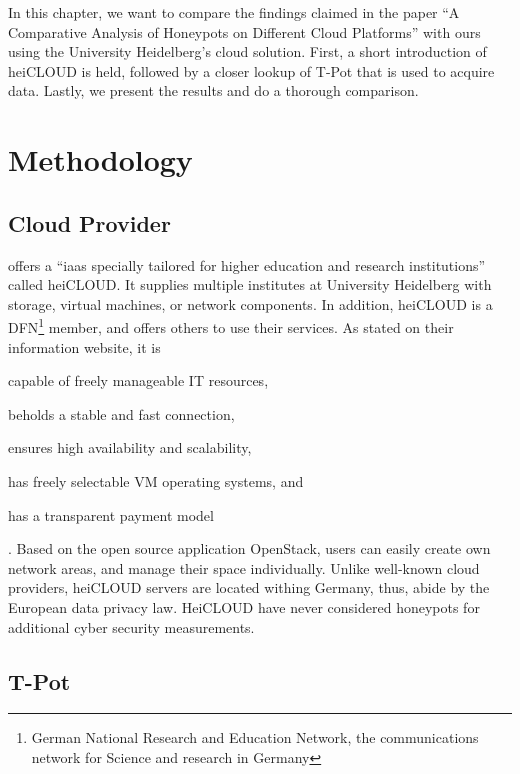 In this chapter, we want to compare the findings \citet{Kelly2021} claimed in the paper \enquote{A Comparative Analysis of Honeypots on Different
    Cloud Platforms} with ours using the University Heidelberg's cloud solution.
First, a short introduction of heiCLOUD is held, followed by a closer lookup of T-Pot that is used to acquire data.
Lastly, we present the results and do a thorough comparison.


\section{Methodology}

\subsection{Cloud Provider}

\citet{urz2021} offers a \enquote{\ac{iaas} specially tailored for higher education and research institutions} called heiCLOUD.
It supplies multiple institutes at University Heidelberg with storage, virtual machines, or network components.
In addition, heiCLOUD is a DFN\footnote{German National Research and Education Network,  the communications network for Science and research in Germany} member, and offers others to use their services.
As stated on their information website\cite{heicloud2021}, it is
\begin{enumerate*}[label=(\roman*)]
    \item capable of freely manageable IT resources,
    \item beholds a stable and fast connection,
    \item ensures high availability and scalability,
    \item has freely selectable VM operating systems, and
    \item has a transparent payment model
\end{enumerate*} \cite{heicloud2021}.
Based on the open source application OpenStack, users can easily create own network areas, and manage their space individually.
Unlike well-known cloud providers, heiCLOUD servers are located withing Germany, thus, abide by the European data privacy law.
HeiCLOUD have never considered honeypots for additional cyber security measurements.

\subsection{T-Pot}
\label{sec:tpot}

